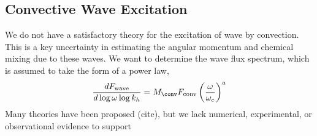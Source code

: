 {\color{purple}
\subsection{Convective Wave Excitation}
}

We do not have a satisfactory theory for the excitation of wave by convection. This is a key uncertainty in estimating the angular momentum and chemical mixing due to these waves. We want to determine the wave flux spectrum, which is assumed to take the form of a power law,
\begin{equation}
\frac{d F_{\rm wave}}{d\log \omega \log k_h} = M_{\conv}F_{\rm conv} \left(\frac{\omega}{\omega_c}\right)^a 
\end{equation}
Many theories have been proposed (cite), but we lack numerical, experimental, or observational evidence to support  
